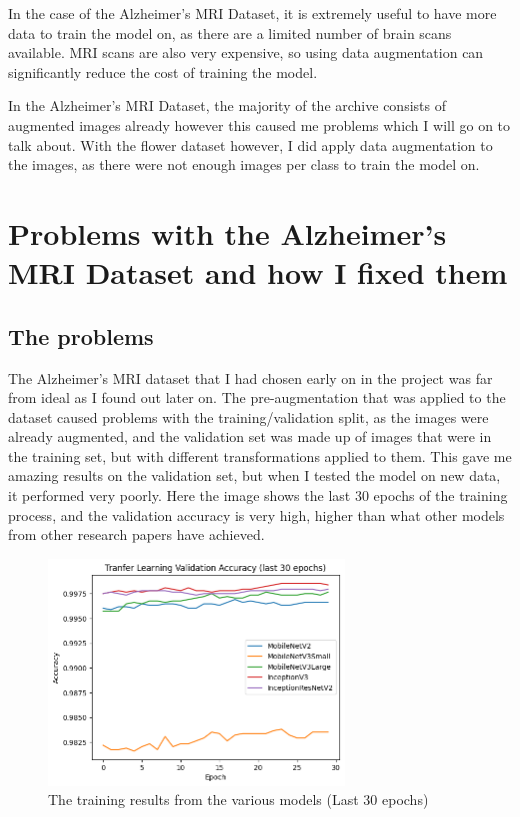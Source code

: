 \documentclass[]{final_report}
\begin{document}
In the case of the Alzheimer's MRI Dataset, it is extremely useful to have more data to train the model on, as there are a limited number of brain scans available.
MRI scans are also very expensive, so using data augmentation can significantly reduce the cost of training the model.

In the Alzheimer's MRI Dataset, the majority of the archive consists of augmented images already however this caused me problems which I will go on to talk about.
With the flower dataset however, I did apply data augmentation to the images, as there were not enough images per class to train the model on.

\section{Problems with the Alzheimer's MRI Dataset and how I fixed them}

\subsection{The problems}
The Alzheimer's MRI dataset that I had chosen early on in the project was far from ideal as I found out later on.
The pre-augmentation that was applied to the dataset caused problems with the training/validation split, as the 
images were already augmented, and the validation set was made up of images that were in the training set, but 
with different transformations applied to them. This gave me amazing results on the validation set, but when I 
tested the model on new data, it performed very poorly. Here the image shows the last 30 epochs of the training process,
and the validation accuracy is very high, higher than what other models from other research papers have achieved.

\begin{figure}[h]
  \centering
  \includegraphics[width=0.7\textwidth]{images/bad-training-result.png}
  \caption{The training results from the various models (Last 30 epochs)}
  \label{fig:training_results}
\end{figure}
\end{document}
